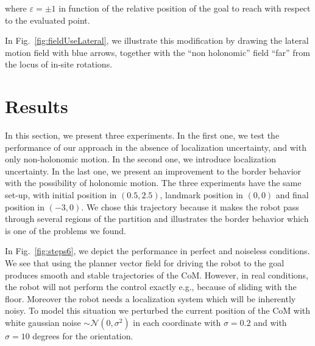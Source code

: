 where $\varepsilon =\pm1$ in function of the relative position of the goal to reach with respect to the evaluated point. 

In Fig.~\ref{fig:fieldUseLateral}, we illustrate this modification by drawing the lateral motion field with blue arrows, together with the ``non holonomic'' field ``far'' from the locus of in-site rotations. 

\section{Results}
\label{sec:results}


In this section, we present three experiments. In the first one, we test the performance of our approach in the absence of localization uncertainty, and with only non-holonomic motion. In the second one, we introduce localization uncertainty. In the last one, we present an improvement to the border behavior with the possibility of holonomic motion. The three experiments have the same set-up, with initial position in $(0.5,2.5)$, landmark position in $(0,0)$ and final position in $(-3,0)$. We chose this trajectory because it makes the robot pass through several regions of the partition and illustrates the border behavior which is one of the problems we found.

In Fig.~\ref{fig:steps6}, we depict the performance in perfect and noiseless conditions. We see that using the planner vector field for driving the robot to the goal produces smooth and stable trajectories of the CoM. However, in real conditions, the robot will not perform the control exactly e.g., because of sliding with the floor. Moreover the robot needs a localization system which will be inherently noisy. To model this situation we perturbed the current position of the CoM with white gaussian noise $\sim \mathcal{N}(0,\sigma^2)$ in each coordinate with $\sigma = 0.2$ and with $\sigma = 10$ degrees for the orientation.

